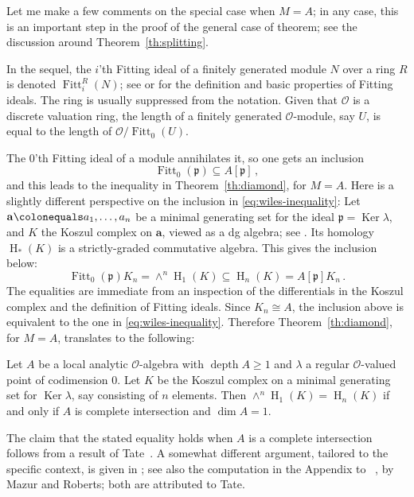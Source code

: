 \documentclass[twoside,leqno]{article}
\newcommand{\depth}{\operatorname{depth}}
\newcommand{\fitt}{\operatorname{Fitt}}
\newcommand{\fp}{{\mathfrak p}}
\newcommand{\hh}{\operatorname{H}}
\newcommand{\Ker}{\operatorname{Ker}}
\newcommand{\mco}{\mathcal O}
\begin{document}
Let me make a few comments on the special case when $M=A$; in any case, this is an important step in the proof of the general case of theorem; see the discussion around Theorem~\ref{th:splitting}.

In the sequel, the $i$'th Fitting ideal of a finitely generated module $N$ over a ring $R$ is denoted $\fitt^R_i(N)$; see \cite[pp.~21]{Bruns/Herzog:1998a} or \cite[Appendix D]{Kunz:1986} for the definition and basic properties of Fitting ideals. The ring is usually suppressed from the notation. Given that $\mco$ is a discrete valuation ring,  the length of a finitely generated $\mco$-module, say $U$, is equal to the length of $\mco/\fitt_0(U)$.

The $0$'th Fitting ideal of a module annihilates it, so one gets an inclusion
\begin{equation}
\label{eq:wiles-inequality}
\fitt_0(\fp) \subseteq A[\fp]\,,
\end{equation}
and this leads to the inequality in Theorem~\ref{th:diamond}, for $M=A$. Here is a slightly different perspective on the inclusion in \eqref{eq:wiles-inequality}: Let $\mathbf{a}\colonequals a_1,\dots,a_n$ be a minimal generating set for the ideal $\fp=\Ker\lambda$, and $K$ the Koszul complex on $\mathbf{a}$, viewed as a dg algebra; see \cite[Proposition~1.6.2]{Bruns/Herzog:1998a}. Its homology $\hh_*(K)$ is a strictly-graded commutative algebra. This gives the inclusion below:
\[
 \fitt_0(\fp) K_n  = \wedge^n \hh_1(K) \subseteq \hh_n(K) = A[\fp]K_n\,. 
\]
The equalities are immediate from an inspection of the differentials in the Koszul complex and the definition of Fitting ideals. Since $K_n\cong A$, the inclusion above is equivalent to the one in \eqref{eq:wiles-inequality}. Therefore Theorem~\ref{th:diamond}, for $M=A$, translates to the following:

\begin{theorem}
\label{th:dlw}
Let $A$ be a local analytic $\mco$-algebra with $\depth A\ge 1$ and $\lambda$ a regular $\mco$-valued point of codimension $0$. Let $K$ be the Koszul complex on a minimal generating set for $\Ker\lambda$, say consisting of $n$ elements. Then $\wedge^n\hh_1(K)=\hh_n(K)$ if and only if $A$ is complete intersection and $\dim A=1$.
\end{theorem}

The claim that the stated equality holds when $A$ is a complete intersection follows from a result of Tate~\cite[Theorem~4]{Tate:1957a}.
A somewhat different argument, tailored to the specific context, is given in \cite[\S5.3]{Darmon/Diamond/Taylor:1997}; see also the computation in the Appendix to ~\cite{Mazur/Roberts:1969}, by Mazur and Roberts; both are attributed to Tate.
\end{document}
